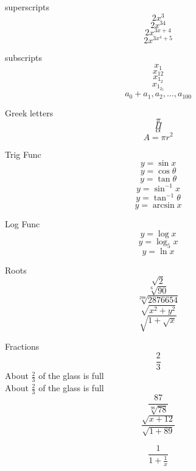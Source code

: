 \documentclass[11pt]{article}
\begin{document}
superscripts $$2x^3$$
$$2x^{34}$$
$$2x^{3x+4}$$
$$2x^{3x^4+5}$$


subscripts 
$$x_1$$
$$x_{12}$$
$$x_{1_2}$$
$$x_{1_{2_3}}$$
$$a_0+a_1,a_2,\ldots,a_{100}$$

Greek letters 
$$\pi$$
$$\Pi$$
$$\alpha$$
$$A= \pi r^2$$

Trig Func
$$y= \sin x$$
$$y= \cos \theta$$
$$y= \tan \theta$$
$$y= \sin^{-1} x$$
$$y= \tan^{-1} \theta$$
$$y= \arcsin x$$

Log Func
$$y= \log x$$
$$y= \log_5 x$$
$$y= \ln x$$

Roots
$$\sqrt{2}$$
$$\sqrt[6]{90}$$
$$\sqrt[298]{2876654}$$
$$\sqrt{x^2+y^2}$$
$$\sqrt{ 1+\sqrt{x}}$$

Fractions
$$\frac{2}{3}$$
About $\frac{2}{3}$ of the glass is full\\[6pt]
About $\displaystyle\frac{2}{3}$ of the glass is full\\[6pt]

$$\frac{87}{\sqrt[98]{78}}$$
$$\frac{\sqrt{x+12}}{\sqrt{1+89}}$$

$$\frac{1}{1+\frac{1}{x}}$$
\end{document}
